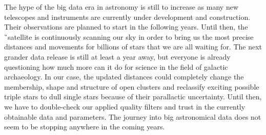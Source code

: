 The hype of the big data era in astronomy is still to increase as many new telescopes and instruments are currently under development and construction. Their observations are planned to start in the following years. Until then, the \G\ satellite is continuously scanning our sky in order to bring us the most precise distances and movements for billions of stars that we are all waiting for. The next grander data release is still at least a year away, but everyone is already questioning how much more can it do for science in the field of galactic archaeology. In our case, the updated distances could completely change the membership, shape and structure of open clusters and reclassify exciting possible triple stars to dull single stars because of their parallactic uncertainty. Until then, we have to double-check our applied quality filters and trust in the currently obtainable data and parameters. The journey into big astronomical data does not seem to be stopping anywhere in the coming years.
